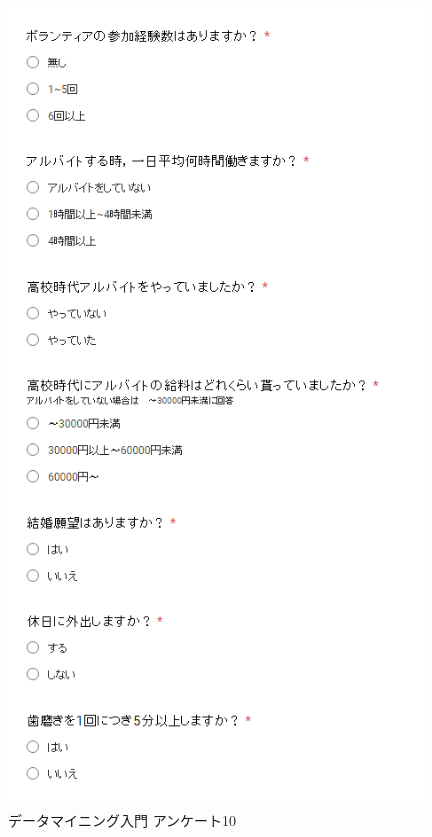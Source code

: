 \begin{figure}[p]
\centering
\includegraphics[width=11cm]{forms10.PNG}
\caption{データマイニング入門 アンケート10}\label{サンプル図}
\end{figure}

